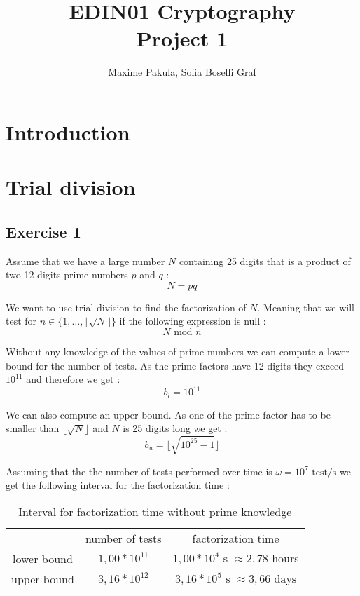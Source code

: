 \documentclass{article}
\title{EDIN01 Cryptography \\ Project 1}
\author{Maxime Pakula, Sofia Boselli Graf}
\begin{document}
\maketitle

\tableofcontents

\newpage

\section{Introduction}

\section{Trial division}

\subsection{Exercise 1}

Assume that we have a large number $N$ containing 25 digits that is a product of two 12 digits prime numbers $p$ and $q$ :
$$N = pq$$

We want to use trial division to find the factorization of $N$. Meaning that we will test for $n \in \{1,\dotsc,\lfloor\sqrt{N}\rfloor\}$ if the following expression is null :
$$N \text{ mod } n$$

Without any knowledge of the values of prime numbers we can compute a lower bound for the number of tests. As the prime factors have 12 digits they exceed $10^{11}$ and therefore we get :
$$b_l = 10^{11}$$

We can also compute an upper bound. As one of the prime factor has to be smaller than $\lfloor\sqrt{N}\rfloor$ and $N$ is 25 digits long we get :
$$b_u = \lfloor\sqrt{10^{25}-1}\rfloor$$

Assuming that the the number of tests performed over time is $\omega = 10^7 \text{ test/s}$ we get the following interval for the factorization time :

\begin{table}[H]
    \centering
    \begin{tabular}{c|c|c}
         & number of tests & factorization time \\
        lower bound & $1,00*10^{11}$ & $1,00*10^{4} \text{ s } \approx 2,78 \text{ hours}$ \\
        upper bound & $ 3,16*10^{12}$ & $3,16*10^{5} \text{ s } \approx 3,66 \text{ days}$
    \end{tabular}
    \caption{Interval for factorization time without prime knowledge}
\end{table}
\end{document}
